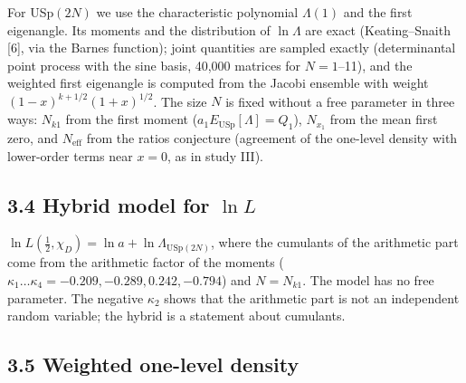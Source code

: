 \documentclass[
  10pt,
]{article}
\begin{document}
For USp\((2N)\) we use the characteristic polynomial \(\Lambda(1)\) and
the first eigenangle. Its moments and the distribution of \(\ln\Lambda\)
are exact (Keating--Snaith {[}6{]}, via the Barnes function); joint
quantities are sampled exactly (determinantal point process with the
sine basis, 40,000 matrices for \(N = 1\)--11), and the weighted first
eigenangle is computed from the Jacobi ensemble with weight
\((1 - x)^{k + 1/2}(1 + x)^{1/2}\). The size \(N\) is fixed without a
free parameter in three ways: \(N_{k1}\) from the first moment
(\(a_1 E_{\mathrm{USp}}[\Lambda] = Q_1\)), \(N_{x_1}\) from the mean
first zero, and \(N_{\mathrm{eff}}\) from the ratios conjecture
(agreement of the one-level density with lower-order terms near
\(x = 0\), as in study III).

\hypertarget{hybrid-model-for-ln-l}{%
\subsection{\texorpdfstring{3.4 Hybrid model for
\(\ln L\)}{3.4 Hybrid model for \textbackslash ln L}}\label{hybrid-model-for-ln-l}}

\(\ln L(\tfrac12, \chi_D) = \ln a + \ln\Lambda_{\mathrm{USp}(2N)}\),
where the cumulants of the arithmetic part come from the arithmetic
factor of the moments
(\(\kappa_1 \dots \kappa_4 = -0.209, -0.289, 0.242, -0.794\)) and
\(N = N_{k1}\). The model has no free parameter. The negative
\(\kappa_2\) shows that the arithmetic part is not an independent random
variable; the hybrid is a statement about cumulants.

\hypertarget{weighted-one-level-density}{%
\subsection{3.5 Weighted one-level
density}\label{weighted-one-level-density}}
\end{document}
